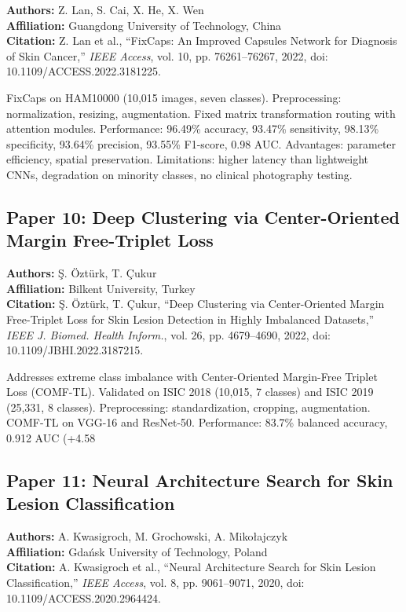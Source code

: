 \documentclass[conference]{IEEEtran}
\begin{document}
\noindent\textbf{Authors:} Z. Lan, S. Cai, X. He, X. Wen\\
\textbf{Affiliation:} Guangdong University of Technology, China\\
\textbf{Citation:} Z. Lan et al., ``FixCaps: An Improved Capsules Network for Diagnosis of Skin Cancer,'' \textit{IEEE Access}, vol. 10, pp. 76261--76267, 2022, doi: 10.1109/ACCESS.2022.3181225.

FixCaps on HAM10000 (10,015 images, seven classes). Preprocessing: normalization, resizing, augmentation. Fixed matrix transformation routing with attention modules. Performance: 96.49\% accuracy, 93.47\% sensitivity, 98.13\% specificity, 93.64\% precision, 93.55\% F1-score, 0.98 AUC. Advantages: parameter efficiency, spatial preservation. Limitations: higher latency than lightweight CNNs, degradation on minority classes, no clinical photography testing.

\subsection{Paper 10: Deep Clustering via Center-Oriented Margin Free-Triplet Loss}

\noindent\textbf{Authors:} Ş. Öztürk, T. Çukur\\
\textbf{Affiliation:} Bilkent University, Turkey\\
\textbf{Citation:} Ş. Öztürk, T. Çukur, ``Deep Clustering via Center-Oriented Margin Free-Triplet Loss for Skin Lesion Detection in Highly Imbalanced Datasets,'' \textit{IEEE J. Biomed. Health Inform.}, vol. 26, pp. 4679--4690, 2022, doi: 10.1109/JBHI.2022.3187215.

Addresses extreme class imbalance with Center-Oriented Margin-Free Triplet Loss (COMF-TL). Validated on ISIC 2018 (10,015, 7 classes) and ISIC 2019 (25,331, 8 classes). Preprocessing: standardization, cropping, augmentation. COMF-TL on VGG-16 and ResNet-50. Performance: 83.7\% balanced accuracy, 0.912 AUC (+4.58%

\subsection{Paper 11: Neural Architecture Search for Skin Lesion Classification}

\noindent\textbf{Authors:} A. Kwasigroch, M. Grochowski, A. Mikołajczyk\\
\textbf{Affiliation:} Gdańsk University of Technology, Poland\\
\textbf{Citation:} A. Kwasigroch et al., ``Neural Architecture Search for Skin Lesion Classification,'' \textit{IEEE Access}, vol. 8, pp. 9061--9071, 2020, doi: 10.1109/ACCESS.2020.2964424.
\end{document}
